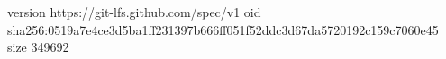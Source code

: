 version https://git-lfs.github.com/spec/v1
oid sha256:0519a7e4ce3d5ba1ff231397b666ff051f52ddc3d67da5720192c159c7060e45
size 349692
